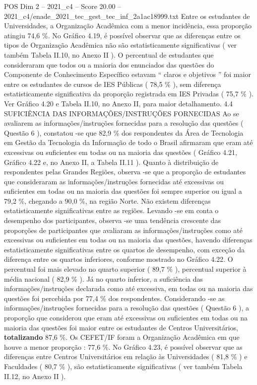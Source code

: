 \begin{textsample}{POS Dim 2 – 2021\_c4 – Score 20.00 – 2021\_c4/enade\_2021\_tec\_gest\_tec\_inf\_2a1ac18999.txt}
Entre os estudantes de Universidades, a Organização Acadêmica com a menor incidência, essa proporção atingiu 74,6 \%.
No Gráfico 4.19, é possível observar que as diferenças entre os tipos de Organização Acadêmica não são estatisticamente significativas ( ver também Tabela II.10, no Anexo II ).
O percentual de estudantes que consideraram que todos ou a maioria dos enunciados das questões do Componente de Conhecimento Específico estavam “ claros e objetivos ” foi maior entre os estudantes de cursos de IES Públicas ( 78,5 \% ), sem diferença estatisticamente significativa da proporção registrada em IES Privadas ( 75,7 \% ).
Ver Gráfico 4.20 e Tabela II.10, no Anexo II, para maior detalhamento. 4.4 SUFICIÊNCIA DAS INFORMAÇÕES/INSTRUÇÕES FORNECIDAS Ao se avaliarem as informações/instruções fornecidas para a resolução das questões ( Questão 6 ), constatou -se que 82,9 \% dos respondentes da Área de Tecnologia em Gestão da Tecnologia da Informação de todo o Brasil afirmaram que eram até excessivas ou suficientes em todas ou na maioria das questões ( Gráfico 4.21, Gráfico 4.22 e, no Anexo II, a Tabela II.11 ).
Quanto à distribuição de respondentes pelas Grandes Regiões, observa -se que a proporção de estudantes que consideraram as informações/instruções fornecidas até excessivas ou suficientes em todas ou na maioria das questões foi sempre superior ou igual a 79,2 \%, chegando a 90,0 \%, na região Norte.
Não existem diferenças estatisticamente significativas entre as regiões.
Levando -se em conta o desempenho dos participantes, observa -se uma tendência crescente das proporções de participantes que avaliaram as informações/instruções como até excessivas ou suficientes em todas ou na maioria das questões, havendo diferenças estatisticamente significativas entre os quartos de desempenho, com exceção da diferença entre os quartos inferiores, conforme mostrado no Gráfico 4.22.
O percentual foi mais elevado no quarto superior ( 89,7 \% ), percentual superior à média nacional ( 82,9 \% ).
Já no quarto inferior, a suficiência das informações/instruções declarada como até excessiva, em todas ou na maioria das questões foi percebida por 77,4 \% dos respondentes.
Considerando -se as informações/instruções fornecidas para a resolução das questões ( Questão 6 ), a proporção que considerou que eram até excessivas ou suficientes em todas ou na maioria das questões foi maior entre os estudantes de Centros Universitários, \textbf{totalizando} 87,6 \%.
Os CEFET/IF foram a Organização Acadêmica em que houve a menor proporção : 77,6 \%.
No Gráfico 4.23, é possível observar que as diferenças entre Centros Universitários em relação às Universidades ( 81,8 \% ) e Faculdades ( 80,7 \% ), são estatisticamente significativas ( ver também Tabela II.12, no Anexo II ).

\end{textsample}
